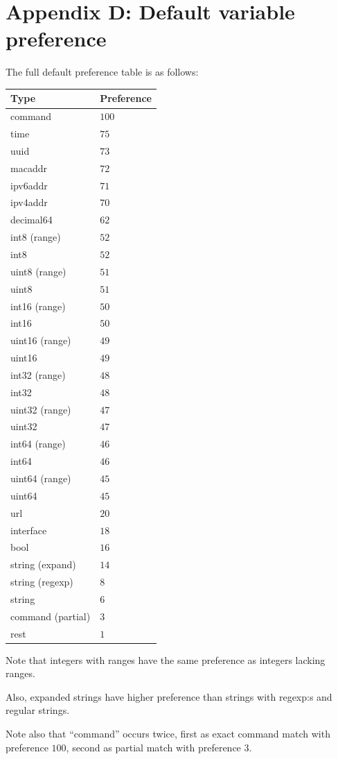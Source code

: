 \documentclass[a4paper, 10pt] {article}
\begin{document}
\newpage
\section*{Appendix D: Default variable preference}
\label{app:varpref}
The full default preference table is as follows:

\begin{tabular}{ | l | l | }
\hline
  \textbf{ Type} & \textbf{Preference} \\
\hline
command           & $100$  \\
time              & $75$   \\
uuid              & $73$   \\
macaddr           & $72$   \\
ipv6addr          & $71$   \\
ipv4addr          & $70$   \\
decimal64         & $62$   \\
int8 (range)      & $52$   \\
int8              & $52$   \\
uint8 (range)     & $51$   \\
uint8             & $51$   \\
int16 (range)     & $50$   \\
int16             & $50$   \\
uint16 (range)    & $49$   \\
uint16            & $49$   \\
int32 (range)     & $48$   \\
int32             & $48$   \\
uint32 (range)    & $47$   \\
uint32            & $47$   \\
int64 (range)     & $46$   \\
int64             & $46$   \\
uint64 (range)    & $45$   \\
uint64            & $45$   \\
url               & $20$   \\
interface         & $18$   \\
bool              & $16$   \\
string (expand)   & $14$   \\
string (regexp)   & $8$    \\
string            & $6$    \\
command (partial) & $3$    \\
rest              & $1$    \\
\hline
\end{tabular}

Note that integers with ranges have the same preference as integers lacking ranges.

Also, expanded strings have higher preference than strings with regexp:s and regular strings.

Note also that ``command'' occurs twice, first as exact command match with preference $100$, second as partial match with preference $3$.
\end{document}
